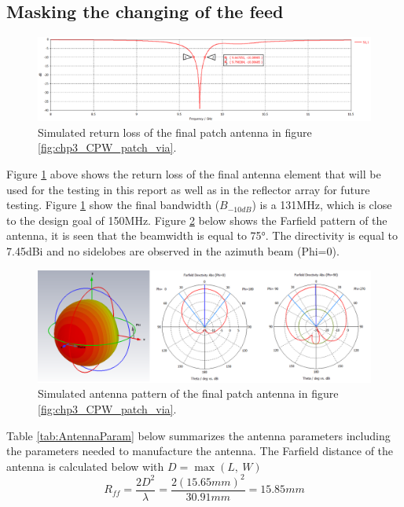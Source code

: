\subsection{Masking the changing of the feed}

    \begin{figure}[H]
    \centering
    \includegraphics[width=0.99\linewidth]{Figures/chp3_CPW_patch_via_results.png}
    \caption{Simulated return loss of the final patch antenna in figure \ref{fig:chp3_CPW_patch_via}.}
    \label{fig:chp3_CPW_patch_via_results}
    \end{figure}

Figure \ref{fig:chp3_CPW_patch_via_results} above shows the return loss of the final antenna element that will be used for the testing in this report as well as in the reflector array for future testing. Figure \ref{fig:chp3_CPW_patch_via_results} show the final bandwidth (\(B_{-10dB}\)) is a 131MHz, which is close to the design goal of 150MHz. Figure \ref{fig:chp3_CPW_patch_via_pattern} below shows the Farfield pattern of the antenna, it is seen that the beamwidth is equal to 75°. The directivity is equal to 7.45dBi and no sidelobes are observed in the azimuth beam (Phi=0).

    \begin{figure}[H]
    \centering
    \includegraphics[width=0.9\linewidth]{Figures/chp3_CPW_patch_via_pattern.png}
    \caption{Simulated antenna pattern of the final patch antenna in figure \ref{fig:chp3_CPW_patch_via}.}
    \label{fig:chp3_CPW_patch_via_pattern}
    \end{figure}

Table \ref{tab:AntennaParam} below summarizes the antenna parameters including the parameters needed to manufacture the antenna. The Farfield distance of the antenna is calculated below with \(D=\max(L,\ W)\)
    \[R_{ff}=\frac{2D^2}{\lambda}=\frac{2{(15.65mm)}^2}{30.91mm}=15.85mm\]

